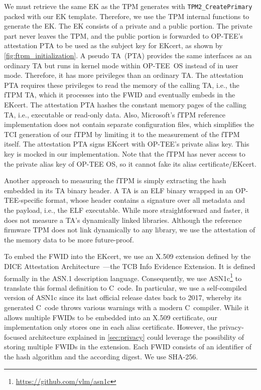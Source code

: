 We must retrieve the same EK as the TPM generates with \texttt{TPM2\_CreatePrimary} packed with our EK template.
Therefore, we use the TPM internal functions to generate the EK\@.
The EK consists of a private and a public portion.
The private part never leaves the TPM, and the public portion is forwarded to OP-TEE's attestation PTA to be used as the subject key for EKcert, as shown by \autoref{fig:ftpm_initialization}.
A pseudo \ac{TA}~(PTA) provides the same interfaces as an ordinary TA but runs in kernel mode within OP-TEE~OS instead of in user mode.
Therefore, it has more privileges than an ordinary TA\@.
The attestation PTA requires these privileges to read the memory of the calling TA, i.e., the fTPM TA, which it processes into the \ac{FWID} and eventually embeds in the EKcert.
The attestation PTA hashes the constant memory pages of the calling TA, i.e., executable or read-only data.
Also, Microsoft's fTPM reference implementation does not contain separate configuration files, which simplifies the TCI generation of our fTPM by limiting it to the measurement of the fTPM itself.
The attestation PTA signs EKcert with OP-TEE's private alias key.
This key is mocked in our implementation.
Note that the fTPM has never access to the private alias key of OP-TEE OS, so it cannot fake its alias certificate/EKcert.

Another approach to measuring the fTPM is simply extracting the hash embedded in its TA binary header.
A TA is an ELF binary wrapped in an OP-TEE-specific format, whose header contains a signature over all metadata and the payload, i.e., the ELF executable.
While more straightforward and faster, it does not measure a TA's dynamically linked libraries.
Although the reference firmware TPM does not link dynamically to any library, we use the attestation of the memory data to be more future-proof.

To embed the FWID into the EKcert, we use an X.509 extension defined by the DICE Attestation Architecture~\cite{TCGAttestation2021}---the TCB Info Evidence Extension.
It is defined formally in the ASN.1 description language.
Consequently, we use ASN1c\footnote{\url{https://github.com/vlm/asn1c}} to translate this formal definition to C~code.
In particular, we use a self-compiled version of ASN1c since its last official release dates back to 2017, whereby its generated C~code throws various warnings with a modern C~compiler.
While it allows multiple FWIDs to be embedded into an X.509 certificate, our implementation only stores one in each alias certificate.
However, the privacy-focused architecture explained in \autoref{sec:privacy} could leverage the possibility of storing multiple FWIDs in the extension.
Each FWID consists of an identifier of the hash algorithm and the according digest.
We use SHA-256.


